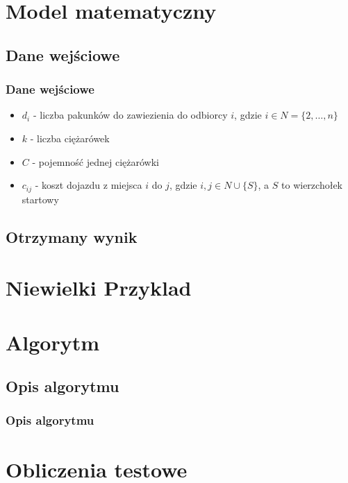 \documentclass{beamer}
\begin{document}
\section{Model matematyczny}
\begin{frame}
\subsection{Dane wejściowe}
\frametitle{Dane wejściowe}
\begin{itemize}
    \item $d_i$ - liczba pakunków do zawiezienia do odbiorcy $i$, gdzie $i \in N = \{2, \dots, n\}$
    \item $k$ - liczba ciężarówek
    \item $C$ - pojemność jednej ciężarówki
    \item $c_{ij}$ - koszt dojazdu z miejsca $i$ do $j$, gdzie $i, j \in N \cup \{S\}$, a $S$ to wierzchołek startowy
\end{itemize}
\end{frame}

\subsection{Otrzymany wynik}
\section{Niewielki Przyklad}
\section{Algorytm}
\begin{frame}
\subsection{Opis algorytmu}
\frametitle{Opis algorytmu}
\end{frame}
\section{Obliczenia testowe}
\end{document}

